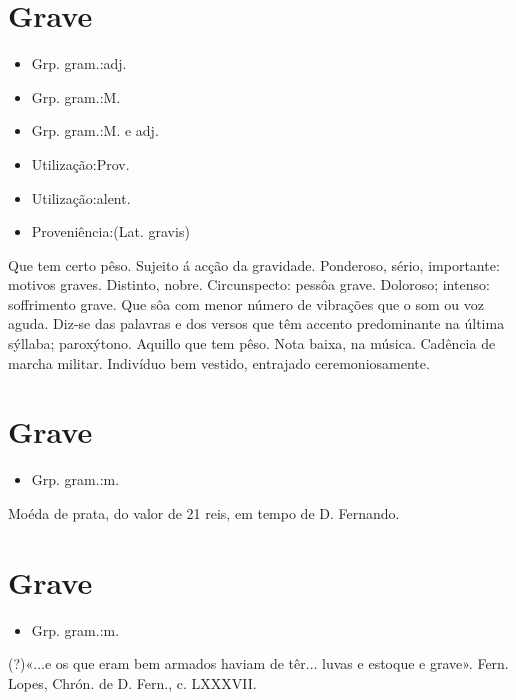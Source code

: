 \section{Grave}
\begin{itemize}
\item {Grp. gram.:adj.}
\end{itemize}
\begin{itemize}
\item {Grp. gram.:M.}
\end{itemize}
\begin{itemize}
\item {Grp. gram.:M.  e  adj.}
\end{itemize}
\begin{itemize}
\item {Utilização:Prov.}
\end{itemize}
\begin{itemize}
\item {Utilização:alent.}
\end{itemize}
\begin{itemize}
\item {Proveniência:(Lat. \textunderscore gravis\textunderscore )}
\end{itemize}
Que tem certo pêso.
Sujeito á acção da gravidade.
Ponderoso, sério, importante: \textunderscore motivos graves\textunderscore .
Distinto, nobre.
Circunspecto: \textunderscore pessôa grave\textunderscore .
Doloroso; intenso: \textunderscore soffrimento grave\textunderscore .
Que sôa com menor número de vibrações que o som ou voz aguda.
Diz-se das palavras e dos versos que têm accento predominante na última sýllaba; paroxýtono.
Aquillo que tem pêso.
Nota baixa, na música.
Cadência de marcha militar.
Indivíduo bem vestido, entrajado ceremoniosamente.
\section{Grave}
\begin{itemize}
\item {Grp. gram.:m.}
\end{itemize}
Moéda de prata, do valor de 21 reis, em tempo de D. Fernando.
\section{Grave}
\begin{itemize}
\item {Grp. gram.:m.}
\end{itemize}
(?)«\textunderscore ...e os que eram bem armados haviam de têr... luvas e estoque e grave\textunderscore ». Fern. Lopes, \textunderscore Chrón. de D. Fern.\textunderscore , c. LXXXVII.
